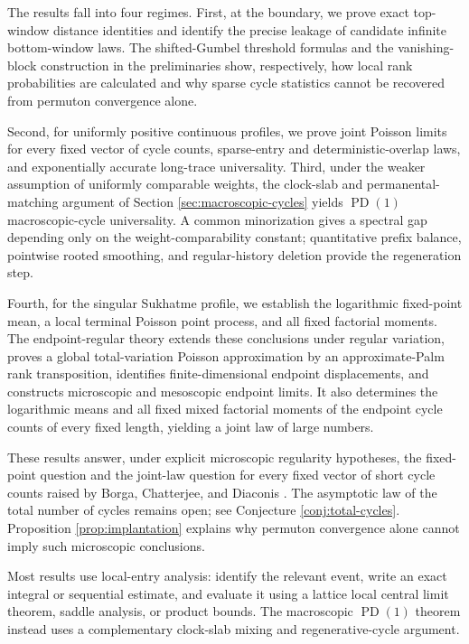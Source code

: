 \documentclass[11pt]{article}
\theoremstyle{remark}
\begin{document}
The results fall into four regimes.  First, at the boundary, we prove exact
top-window distance identities and identify the precise leakage of candidate
infinite bottom-window laws.  The shifted-Gumbel threshold formulas and the
vanishing-block construction in the preliminaries show, respectively, how local
rank probabilities are calculated and why sparse cycle statistics cannot be
recovered from permuton convergence alone.

Second, for uniformly positive continuous profiles, we prove joint Poisson
limits for every fixed vector of cycle counts, sparse-entry and
deterministic-overlap laws, and exponentially accurate long-trace universality.
Third, under the weaker assumption of uniformly comparable weights, the
clock-slab and permanental-matching argument of Section
\ref{sec:macroscopic-cycles} yields $\operatorname{PD}(1)$ macroscopic-cycle
universality.  A common minorization gives a spectral gap depending only on the
weight-comparability constant; quantitative prefix balance, pointwise rooted
smoothing, and regular-history deletion provide the regeneration step.

Fourth, for the singular Sukhatme profile, we establish the logarithmic
fixed-point mean, a local terminal Poisson point process, and all fixed
factorial moments.  The endpoint-regular theory extends these conclusions under
regular variation, proves a global total-variation Poisson approximation by an
approximate-Palm rank transposition, identifies finite-dimensional endpoint
displacements, and constructs microscopic and mesoscopic endpoint limits.  It
also determines the logarithmic means and all fixed mixed factorial moments of
the endpoint cycle counts of every fixed length, yielding a joint law of large
numbers.

These results answer, under explicit microscopic regularity hypotheses, the
fixed-point question and the joint-law question for every fixed vector of short
cycle counts raised by Borga, Chatterjee, and Diaconis
\cite[Section~5.2]{BCD2025}.  The asymptotic law of the total number of cycles
remains open; see Conjecture \ref{conj:total-cycles}.  Proposition
\ref{prop:implantation} explains why permuton convergence alone cannot imply
such microscopic conclusions.

Most results use local-entry analysis: identify the relevant event, write an
exact integral or sequential estimate, and evaluate it using a lattice local
central limit theorem, saddle analysis, or product bounds.  The macroscopic
$\operatorname{PD}(1)$ theorem instead uses a complementary clock-slab mixing
and regenerative-cycle argument.
\end{document}
